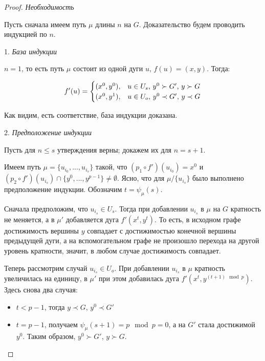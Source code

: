 \begin{proof}
	
	\textit {Необходимость}
	
	Пусть сначала имеем путь $\mu$ длины $n$ на $G$. Доказательство будем проводить индукцией по $n$.
	
	1. \textit {База индукции}
	
	$n = 1$, то есть путь $\mu$ состоит из одной дуги $u$, $f(u) = (x, y)$. Тогда:
	
	\begin{equation*}
	f'(u) = 
	\begin{cases}
	(x^0, y^0), &\text{$ u \in U_s$, $y^0 \succ G'$, $y \succ G$}\\
	(x^0, y^1), &\text{$ u \in U_o$, $y^0 \prec G'$, $y \prec G$}
	\end{cases}
	\end{equation*} 
	
	Как видим, есть соответствие, база индукции доказана.
	
	2. \textit {Предположение индукции}
	
	Пусть для $ n \leq s$ утверждения верны; докажем их для $ n = s + 1$.
	
	Имеем путь $\mu = \{u_{i_0}, ... , u_{i_s}\}$ такой, что $(p_1 \circ f')(u_{i_0}) = x^0$ и $(p_2 \circ f')(u_{i_s}) \cap \{y^0, ... , y^{p-1}\} \neq \emptyset$. Ясно, что для $\mu / \{u_{i_s}\}$ было выполнено предположение индукции. Обозначим $t = \psi_\mu(s)$.
	
	Сначала предположим, что $u_{i_s} \in U_s$. Тогда при добавлении $u_{i_s}$ в $\mu$ на $G$ кратность не меняется, а в $\mu'$ добавляется дуга $f'(x^t, y^t)$. То есть, в исходном графе достижимость вершины $y$ совпадает с достижимостью конечной вершины предыдущей дуги, а на вспомогательном графе не произошло перехода на другой уровень кратности, значит, в любом случае достижимость совпадает. 
	
	Теперь рассмотрим случай $u_{i_s} \in U_o$. При добавлении $u_{i_s}$ в $\mu$ кратность увеличилась на единицу, в $\mu'$ при этом добавилась дуга $f'(x^t, y^{(t+1) \mod p})$. Здесь снова два случая:
	
	\begin{itemize}
		\item $t < p - 1$, тогда  $y \prec G$, $y^0 \prec G'$
		\item $t = p - 1$, получаем $\psi_\mu(s+1) = p\mod p = 0$, а на $G'$ стала достижимой $y^0$. Таким образом, $y^0 \succ G'$, $y \succ G$.
	\end{itemize}
	

\end{proof}
